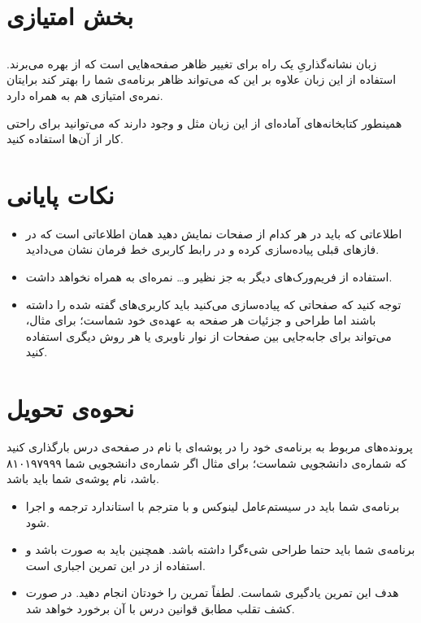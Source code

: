\documentclass{utap}
\begin{document}
	
	
	
	\section{بخش امتیازی}
		\subsection{}
	زبان نشانه‌گذاریِ 
 یک راه برای تغییر ظاهر صفحه‌هایی است که از  بهره می‌برند. استفاده از این زبان علاوه بر این که می‌تواند ظاهر برنامه‌ی شما را بهتر کند برایتان نمره‌ی امتیازی هم به همراه دارد.
 
 همینطور کتابخانه‌های آماده‌ای از این زبان مثل
  و
  وجود دارند که می‌توانید برای راحتی کار از آن‌ها استفاده کنید. 
 
 
 
 
	\section{نکات پایانی}
		\begin{itemize}
			\item  اطلاعاتی که باید در هر کدام از صفحات نمایش دهید همان اطلاعاتی است که در فاز‌های قبلی پیاده‌سازی کرده‌ و در رابط کاربری خط فرمان نشان می‌دادید. 
			\item  
			استفاده از فریم‌ورک‌های دیگر به جز
				نظیر 
				و\dots{} نمره‌ای به همراه نخواهد داشت.
				
			\item 
			توجه کنید که صفحاتی که پیادەسازی می‌کنید باید کاربری‌های گفته شده را داشته باشند اما طراحی و جزئیات هر صفحه به عهدەی خود شماست؛ برای مثال، می‌تواند برای جابه‌جایی بین صفحات از نوار ناوبری
			یا هر روش دیگری استفاده کنید. 
		\end{itemize}

	\section{نحوه‌ی تحویل}
		پرونده‌‌های مربوط به برنامه‌ی خود را در پوشه‌ای با نام  در صفحه‌ی  درس بارگذاری کنید که  شماره‌ی دانشجویی شماست؛ برای مثال اگر شماره‌ی دانشجویی شما ۸۱۰۱۹۷۹۹۹ باشد، نام پوشه‌ی شما باید  باشد.
		\begin{itemize}
			\item
						برنامه‌ی شما باید در سیستم‌عامل لینوکس و با مترجم  با استاندارد  ترجمه و اجرا شود.
					\item
						برنامه‌ی شما باید حتما طراحی شیءگرا داشته باشد. همچنین باید به صورت  باشد و استفاده از  در این تمرین اجباری است.
					\item
						هدف این تمرین یادگیری شماست. لطفاً تمرین را خودتان انجام دهید. در صورت کشف تقلب مطابق قوانین درس با آن برخورد خواهد شد.
		\end{itemize}
\end{document}
